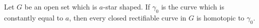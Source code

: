 Let $G$ be an open set which is $a$-star shaped. If $\gamma_0$ is the curve which is constantly equal to $a$, then every closed rectifiable curve in $G$ is homotopic to $\gamma_0$.
